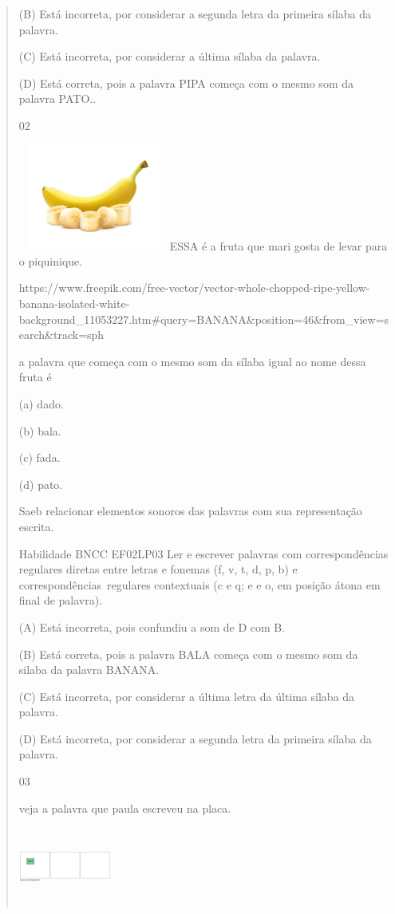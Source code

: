 \begin{verse}
{{{{{{{{{{{{{{{{{{{{(B) Está incorreta, por considerar a segunda letra da primeira sílaba da
palavra.

(C) Está incorreta, por considerar a última sílaba da palavra.

(D) Está correta, pois a palavra PIPA começa com o mesmo som da palavra
PATO..

\num{02}

\includegraphics[width=1.96704in,height=1.37153in]{media/image175.jpeg}ESSA
é a fruta que mari gosta de levar para o piquinique.

https://www.freepik.com/free-vector/vector-whole-chopped-ripe-yellow-banana-isolated-white-background\_11053227.htm\#query=BANANA\&position=46\&from\_view=search\&track=sph

a palavra que começa com o mesmo som da sílaba igual ao nome dessa fruta
é

(a) dado.

(b) bala.

(c) fada.

(d) pato.

Saeb relacionar elementos sonoros das palavras com sua representação
escrita.

Habilidade BNCC EF02LP03 Ler e escrever palavras com correspondências
regulares diretas entre letras e fonemas (f, v, t, d, p, b) e
correspondências~regulares contextuais (c e q; e e o, em posição átona
em final de palavra).

(A) Está incorreta, pois confundiu a som de D com B.

(B) Está correta, pois a palavra BALA começa com o mesmo som da silaba
da palavra BANANA.

(C) Está incorreta, por considerar a última letra da última sílaba da
palavra.

(D) Está incorreta, por considerar a segunda letra da primeira sílaba da
palavra.

\num{03}

veja a palavra que paula escreveu na placa.

\includegraphics[width=1.19861in,height=1.00625in]{media/image176.png}

}}}}}}}}}}}}}}}}}}}}
\end{verse}
